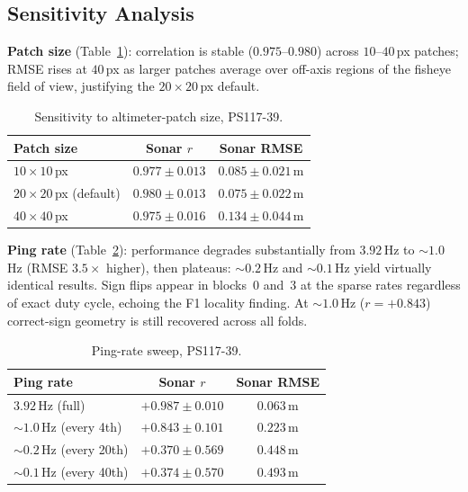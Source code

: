 \documentclass[conference]{IEEEtran}
\begin{document}
\subsection{Sensitivity Analysis}

\textbf{Patch size} (Table~\ref{tab:patch}): correlation is stable
($0.975$--$0.980$) across $10$--$40$\,px patches; RMSE rises at $40$\,px as
larger patches average over off-axis regions of the fisheye field of view,
justifying the $20{\times}20$\,px default.

\begin{table}[t]
\centering
\caption{Sensitivity to altimeter-patch size, PS117-39.}
\label{tab:patch}
\begin{tabular}{@{}lcc@{}}
\toprule
Patch size & Sonar $r$ & Sonar RMSE \\
\midrule
$10{\times}10$\,px & $0.977 \pm 0.013$ & $0.085 \pm 0.021$\,m \\
$20{\times}20$\,px (default) & $\mathbf{0.980 \pm 0.013}$ & $\mathbf{0.075 \pm 0.022}$\,m \\
$40{\times}40$\,px & $0.975 \pm 0.016$ & $0.134 \pm 0.044$\,m \\
\bottomrule
\end{tabular}
\end{table}

\textbf{Ping rate} (Table~\ref{tab:pingrate}): performance degrades
substantially from $3.92$\,Hz to ${\sim}1.0$\,Hz (RMSE $3.5\times$
higher), then plateaus: ${\sim}0.2$\,Hz and ${\sim}0.1$\,Hz yield
virtually identical results. Sign flips appear in blocks~0 and~3 at
the sparse rates regardless of exact duty cycle, echoing the F1 locality
finding. At ${\sim}1.0$\,Hz ($r=+0.843$) correct-sign geometry is still
recovered across all folds.

\begin{table}[t]
\centering
\caption{Ping-rate sweep, PS117-39.}
\label{tab:pingrate}
\begin{tabular}{@{}lcc@{}}
\toprule
Ping rate & Sonar $r$ & Sonar RMSE \\
\midrule
$3.92$\,Hz (full) & $+0.987\pm0.010$ & $0.063$\,m \\
${\sim}1.0$\,Hz (every 4th) & $+0.843\pm0.101$ & $0.223$\,m \\
${\sim}0.2$\,Hz (every 20th) & $+0.370\pm0.569$ & $0.448$\,m \\
${\sim}0.1$\,Hz (every 40th) & $+0.374\pm0.570$ & $0.493$\,m \\
\bottomrule
\end{tabular}
\end{table}
\end{document}
